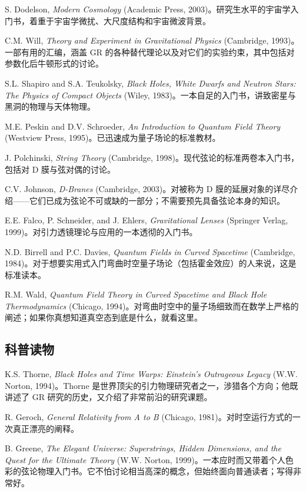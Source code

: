 S. Dodelson, \emph{Modern Cosmology} (Academic Press, 2003)。研究生水平的宇宙学入门书，着重于宇宙学微扰、大尺度结构和宇宙微波背景。

C.M. Will, \emph{Theory and Experiment in Gravitational Physics} (Cambridge, 1993)。一部有用的汇编，涵盖 GR 的各种替代理论以及对它们的实验约束，其中包括对参数化后牛顿形式的讨论。

S.L. Shapiro and S.A. Teukolsky, \emph{Black Holes, White Dwarfs and Neutron Stars: The Physics of Compact Objects} (Wiley, 1983)。一本自足的入门书，讲致密星与黑洞的物理与天体物理。

M.E. Peskin and D.V. Schroeder, \emph{An Introduction to Quantum Field Theory} (Westview Press, 1995)。已迅速成为量子场论的标准教材。

J. Polchinski, \emph{String Theory} (Cambridge, 1998)。现代弦论的标准两卷本入门书，包括对 D 膜与弦对偶的讨论。

C.V. Johnson, \emph{D-Branes} (Cambridge, 2003)。对被称为 D 膜的延展对象的详尽介绍——它们已成为弦论不可或缺的一部分；不需要预先具备弦论本身的知识。

E.E. Falco, P. Schneider, and J. Ehlers, \emph{Gravitational Lenses} (Springer Verlag, 1999)。对引力透镜理论与应用的一本透彻的入门书。

N.D. Birrell and P.C. Davies, \emph{Quantum Fields in Curved Spacetime} (Cambridge, 1984)。对于想要实用式入门弯曲时空量子场论（包括霍金效应）的人来说，这是标准读本。

R.M. Wald, \emph{Quantum Field Theory in Curved Spacetime and Black Hole Thermodynamics} (Chicago, 1994)。对弯曲时空中的量子场细致而在数学上严格的阐述；如果你真想知道真空态到底是什么，就看这里。

\subsection*{科普读物}

K.S. Thorne, \emph{Black Holes and Time Warps: Einstein's Outrageous Legacy} (W.W. Norton, 1994)。Thorne 是世界顶尖的引力物理研究者之一，涉猎各个方向；他既讲述了 GR 研究的历史，又介绍了非常前沿的研究课题。

R. Geroch, \emph{General Relativity from A to B} (Chicago, 1981)。对时空运行方式的一次真正漂亮的阐释。

B. Greene, \emph{The Elegant Universe: Superstrings, Hidden Dimensions, and the Quest for the Ultimate Theory} (W.W. Norton, 1999)。一本应时而又带着个人色彩的弦论物理入门书。它不怕讨论相当高深的概念，但始终面向普通读者；写得非常好。

